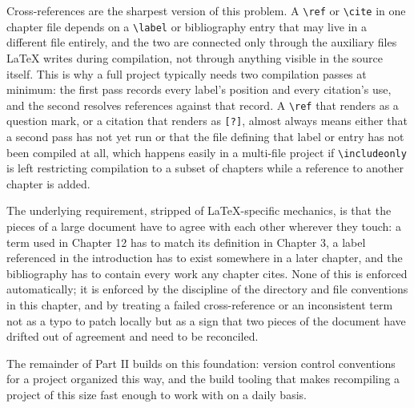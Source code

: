 Cross-references are the sharpest version of this problem. A \texttt{\textbackslash{}ref} or \texttt{\textbackslash{}cite} in one chapter file depends on a \texttt{\textbackslash{}label} or bibliography entry that may live in a different file entirely, and the two are connected only through the auxiliary files LaTeX writes during compilation, not through anything visible in the source itself. This is why a full project typically needs two compilation passes at minimum: the first pass records every label's position and every citation's use, and the second resolves references against that record. A \texttt{\textbackslash{}ref} that renders as a question mark, or a citation that renders as \texttt{{[}?{]}}, almost always means either that a second pass has not yet run or that the file defining that label or entry has not been compiled at all, which happens easily in a multi-file project if \texttt{\textbackslash{}includeonly} is left restricting compilation to a subset of chapters while a reference to another chapter is added.

The underlying requirement, stripped of LaTeX-specific mechanics, is that the pieces of a large document have to agree with each other wherever they touch: a term used in Chapter 12 has to match its definition in Chapter 3, a label referenced in the introduction has to exist somewhere in a later chapter, and the bibliography has to contain every work any chapter cites. None of this is enforced automatically; it is enforced by the discipline of the directory and file conventions in this chapter, and by treating a failed cross-reference or an inconsistent term not as a typo to patch locally but as a sign that two pieces of the document have drifted out of agreement and need to be reconciled.

The remainder of Part II builds on this foundation: version control conventions for a project organized this way, and the build tooling that makes recompiling a project of this size fast enough to work with on a daily basis.
